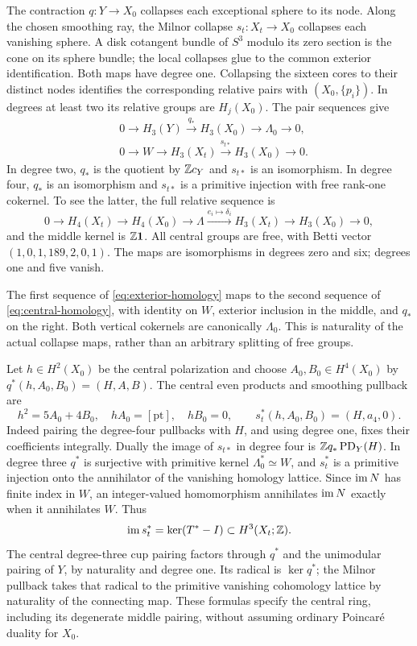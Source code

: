 The contraction $q:Y\to X_0$ collapses each exceptional sphere to its
node. Along the chosen smoothing ray, the Milnor collapse
$s_t:X_t\to X_0$ collapses each vanishing sphere. A disk cotangent bundle
of $S^3$ modulo its zero section is the cone on its sphere bundle; the
local collapses glue to the common exterior identification. Both maps
have degree one. Collapsing the sixteen cores to their distinct nodes
identifies the corresponding relative pairs with $(X_0,\{p_i\})$.
In degrees at least two its relative groups are $H_j(X_0)$. The pair
sequences give
\begin{equation}\label{eq:central-homology}
 \begin{split}
 &0\to H_3(Y)\xrightarrow{q_*}H_3(X_0)\to \Lambda_0\to0,\\
 &0\to W\to H_3(X_t)\xrightarrow{s_{t*}}H_3(X_0)\to0.
 \end{split}
\end{equation}
In degree two, $q_*$ is the quotient by $\mathbb Z c_Y$ and $s_{t*}$ is
an isomorphism. In degree four, $q_*$ is an isomorphism and $s_{t*}$
is a primitive injection with free rank-one cokernel. To see the latter,
the full relative sequence is
\[
 0\to H_4(X_t)\to H_4(X_0)\to\Lambda
 \xrightarrow{e_i\mapsto\delta_i}H_3(X_t)\to H_3(X_0)\to0,
\]
and the middle kernel is $\mathbb Z\mathbf1$. All central groups are free,
with Betti vector $(1,0,1,189,2,0,1)$. The maps are isomorphisms in
degrees zero and six; degrees one and five vanish.

The first sequence of \eqref{eq:exterior-homology} maps to the second
sequence of \eqref{eq:central-homology}, with identity on $W$, exterior
inclusion in the middle, and $q_*$ on the right. Both vertical cokernels
are canonically $\Lambda_0$. This is naturality of the actual collapse maps,
rather than an arbitrary splitting of free groups.

Let $h\in H^2(X_0)$ be the central polarization and choose
$A_0,B_0\in H^4(X_0)$ by $q^*(h,A_0,B_0)=(H,A,B)$.
The central even products and smoothing pullback are
\begin{equation}\label{eq:central-ring}
 h^2=5A_0+4B_0,\quad hA_0=[\mathrm{pt}],\quad hB_0=0,
 \qquad s_t^*(h,A_0,B_0)=(H,a_4,0).
\end{equation}
Indeed pairing the degree-four pullbacks with $H$, and using degree one,
fixes their coefficients integrally. Dually the image of $s_{t*}$ in
degree four is $\mathbb Z q_*\operatorname{PD}_Y(H)$. In degree three $q^*$ is surjective
with primitive kernel $\Lambda_0^*\simeq W$, and $s_t^*$ is a primitive injection
onto the annihilator of the vanishing homology lattice. Since $\operatorname{im} N$
has finite index in $W$, an integer-valued homomorphism annihilates
$\operatorname{im} N$ exactly when it annihilates $W$. Thus
\[
 \operatorname{im} s_t^*=\ker(T^*-I)\subset H^3(X_t;\mathbb Z).
\]
The central degree-three cup pairing factors through $q^*$ and the
unimodular pairing of $Y$, by naturality and degree one. Its radical is
$\ker q^*$; the Milnor pullback takes that radical to the primitive
vanishing cohomology lattice by naturality of the connecting map.
These formulas specify the central ring, including its degenerate
middle pairing, without assuming ordinary Poincar\'e duality for $X_0$.

